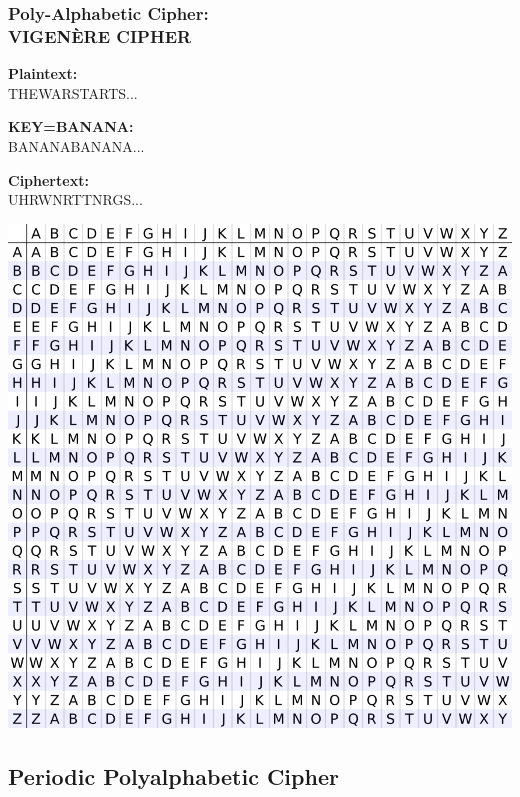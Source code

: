 \documentclass{uva-inf-presentation}
\begin{document}
\begin{frame}
\frametitle{Poly-Alphabetic Cipher:\\ VIGENÈRE CIPHER}
\begin{minipage}{0.55\linewidth}

\textbf{Plaintext:}\\
\hspace{4ex}THEWARSTARTS...

\textbf{KEY=BANANA:}\\
\hspace{4ex}BANANABANANA...

\textbf{Ciphertext:}\\
\hspace{4ex}UHRWNRTTNRGS... 

\end{minipage}%
\begin{minipage}{0.45\linewidth}
\centering
\includegraphics[width=0.95\linewidth]{Vigenere_square_shading} %
\end{minipage}
\end{frame}

\subsection{Periodic Polyalphabetic Cipher}
\frame{\tableofcontents[currentsubsection]}
\end{document}
